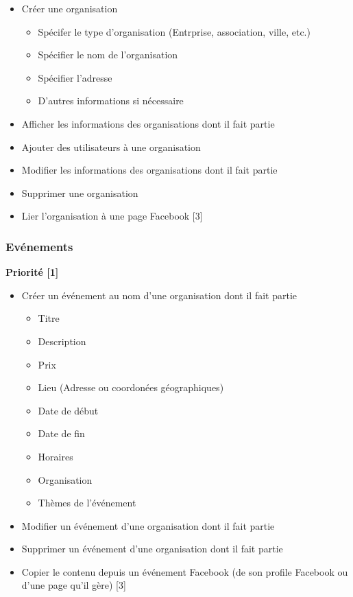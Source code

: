 \documentclass[11pt, a4paper, french, twoside]{article}
\begin{document}
				\begin{itemize}
					\item Créer une organisation
						\begin{itemize}
							\item Spécifer le type d'organisation (Entrprise, association, ville, etc.)
							\item Spécifier le nom de l'organisation
							\item Spécifier l'adresse
							\item D'autres informations si nécessaire
						\end{itemize}
					\item Afficher les informations des organisations dont il fait partie
					\item Ajouter des utilisateurs à une organisation
					\item Modifier les informations des organisations dont il fait partie
					\item Supprimer une organisation
					\item Lier l'organisation à une page Facebook [3]
				\end{itemize}
			
			\subsubsection{Evénements}
			\label{subsubsec:evenements}
				
				\textbf{Priorité [1]}
			
				\begin{itemize}
					\item Créer un événement au nom d'une organisation dont il fait partie
						\begin{itemize}
							\item Titre
							\item Description
							\item Prix
							\item Lieu (Adresse ou coordonées géographiques)
							\item Date de début
							\item Date de fin
							\item Horaires
							\item Organisation
							\item Thèmes de l'événement
						\end{itemize}
					\item Modifier un événement d'une organisation dont il fait partie
					\item Supprimer un événement d'une organisation dont il fait partie
					\item Copier le contenu depuis un événement Facebook (de son profile Facebook ou d'une page qu'il gère) [3]
				\end{itemize}
			
\end{document}

